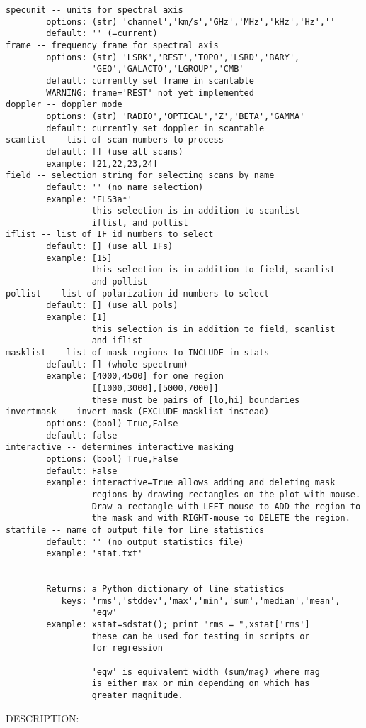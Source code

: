 \begin{verbatim}
specunit -- units for spectral axis
        options: (str) 'channel','km/s','GHz','MHz','kHz','Hz',''
        default: '' (=current)
frame -- frequency frame for spectral axis
        options: (str) 'LSRK','REST','TOPO','LSRD','BARY',
                 'GEO','GALACTO','LGROUP','CMB'
        default: currently set frame in scantable
        WARNING: frame='REST' not yet implemented
doppler -- doppler mode
        options: (str) 'RADIO','OPTICAL','Z','BETA','GAMMA'
        default: currently set doppler in scantable
scanlist -- list of scan numbers to process
        default: [] (use all scans)
        example: [21,22,23,24]
field -- selection string for selecting scans by name
        default: '' (no name selection)
        example: 'FLS3a*'
                 this selection is in addition to scanlist
                 iflist, and pollist
iflist -- list of IF id numbers to select
        default: [] (use all IFs)
        example: [15]
                 this selection is in addition to field, scanlist
                 and pollist
pollist -- list of polarization id numbers to select
        default: [] (use all pols)
        example: [1]
                 this selection is in addition to field, scanlist
                 and iflist
masklist -- list of mask regions to INCLUDE in stats
        default: [] (whole spectrum)
        example: [4000,4500] for one region
                 [[1000,3000],[5000,7000]]
                 these must be pairs of [lo,hi] boundaries
invertmask -- invert mask (EXCLUDE masklist instead)
        options: (bool) True,False
        default: false
interactive -- determines interactive masking
        options: (bool) True,False
        default: False
        example: interactive=True allows adding and deleting mask
                 regions by drawing rectangles on the plot with mouse.
                 Draw a rectangle with LEFT-mouse to ADD the region to
                 the mask and with RIGHT-mouse to DELETE the region.
statfile -- name of output file for line statistics
        default: '' (no output statistics file)
        example: 'stat.txt'

-------------------------------------------------------------------
        Returns: a Python dictionary of line statistics
           keys: 'rms','stddev','max','min','sum','median','mean',
                 'eqw'
        example: xstat=sdstat(); print "rms = ",xstat['rms']
                 these can be used for testing in scripts or
                 for regression

                 'eqw' is equivalent width (sum/mag) where mag
                 is either max or min depending on which has
                 greater magnitude.
\end{verbatim}
    DESCRIPTION:

